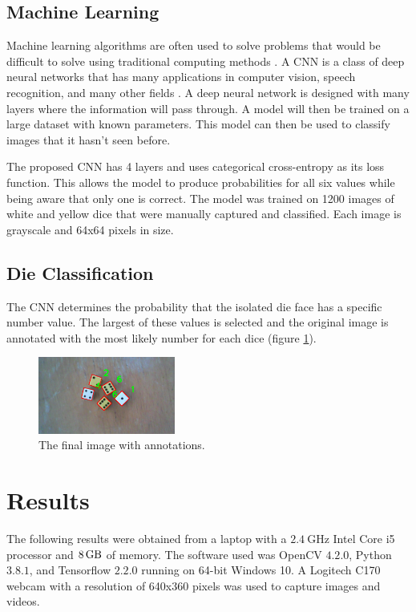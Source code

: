 \documentclass[conference]{IEEEtran}
\begin{document}
\subsection{Machine Learning}

Machine learning algorithms are often used to solve problems that would be difficult to solve using traditional computing methods \cite{Goodfellow2016}.
A CNN is a class of deep neural networks that has many applications in computer vision, speech recognition, and many other fields \cite{Pena2014}\cite{Madabhushi2016}\cite{Lawrence1997}\cite{Kalchbrenner2014}.
A deep neural network is designed with many layers where the information will pass through.
A model will then be trained on a large dataset with known parameters.
This model can then be used to classify images that it hasn't seen before.

The proposed CNN has 4 layers and uses categorical cross-entropy as its loss function. 
This allows the model to produce probabilities for all six values while being aware that only one is correct.
The model was trained on 1200 images of white and yellow dice that were manually captured and classified.
Each image is grayscale and 64x64 pixels in size.

\subsection{Die Classification}

The CNN determines the probability that the isolated die face has a specific number value.
The largest of these values is selected and the original image is annotated with the most likely number for each dice (figure \ref{fig:annotated}).
\begin{figure}[H]
	\centering
	\includegraphics[width=0.4\textwidth]{annotated}
	\caption{The final image with annotations.}
	\label{fig:annotated}
\end{figure}

\section{Results}

The following results were obtained from a laptop with a $\SI{2.4}{\giga\hertz}$ Intel Core i5 processor and $\SI{8}{\giga\byte}$ of memory.
The software used was OpenCV $4.2.0$, Python $3.8.1$, and Tensorflow $2.2.0$ running on 64-bit Windows 10.
A Logitech C170 webcam with a resolution of 640x360 pixels was used to capture images and videos.
\end{document}
